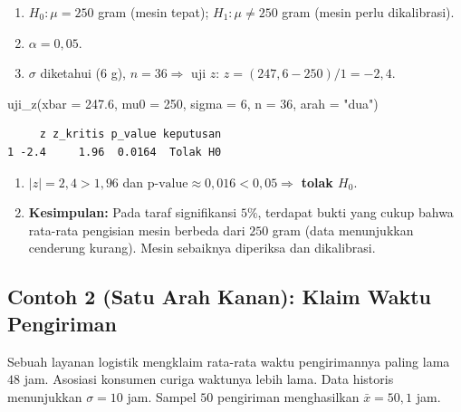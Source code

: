 \documentclass[
  indonesian,
  letterpaper,
]{book}
\newenvironment{Shaded}{\begin{snugshade}}{\end{snugshade}}
\newcommand{\AttributeTok}[1]{\textcolor[rgb]{0.40,0.45,0.13}{#1}}
\newcommand{\DecValTok}[1]{\textcolor[rgb]{0.68,0.00,0.00}{#1}}
\newcommand{\FloatTok}[1]{\textcolor[rgb]{0.68,0.00,0.00}{#1}}
\newcommand{\FunctionTok}[1]{\textcolor[rgb]{0.28,0.35,0.67}{#1}}
\newcommand{\NormalTok}[1]{\textcolor[rgb]{0.00,0.23,0.31}{#1}}
\newcommand{\StringTok}[1]{\textcolor[rgb]{0.13,0.47,0.30}{#1}}
\providecommand{\tightlist}{%
  \setlength{\itemsep}{0pt}\setlength{\parskip}{0pt}}
\begin{document}
\begin{enumerate}
\def\labelenumi{\arabic{enumi}.}
\tightlist
\item
  \(H_0: \mu = 250\) gram (mesin tepat); \(H_1: \mu \ne 250\) gram
  (mesin perlu dikalibrasi).
\item
  \(\alpha = 0{,}05\).
\item
  \(\sigma\) diketahui (\(6\) g), \(n = 36 \Rightarrow\) uji \(z\):
  \(z = (247{,}6 - 250) / 1 = -2{,}4\).
\end{enumerate}

\begin{Shaded}
\begin{Highlighting}[]
\FunctionTok{uji\_z}\NormalTok{(}\AttributeTok{xbar =} \FloatTok{247.6}\NormalTok{, }\AttributeTok{mu0 =} \DecValTok{250}\NormalTok{, }\AttributeTok{sigma =} \DecValTok{6}\NormalTok{, }\AttributeTok{n =} \DecValTok{36}\NormalTok{, }\AttributeTok{arah =} \StringTok{"dua"}\NormalTok{)}
\end{Highlighting}
\end{Shaded}

\begin{verbatim}
     z z_kritis p_value keputusan
1 -2.4     1.96  0.0164  Tolak H0
\end{verbatim}

\begin{enumerate}
\def\labelenumi{\arabic{enumi}.}
\setcounter{enumi}{3}
\tightlist
\item
  \(|z| = 2{,}4 > 1{,}96\) dan
  \(\text{p-value} \approx 0{,}016 < 0{,}05 \Rightarrow\) \textbf{tolak
  \(H_0\)}.
\item
  \textbf{Kesimpulan:} Pada taraf signifikansi \(5\%\), terdapat bukti
  yang cukup bahwa rata-rata pengisian mesin berbeda dari \(250\) gram
  (data menunjukkan cenderung kurang). Mesin sebaiknya diperiksa dan
  dikalibrasi.
\end{enumerate}

\subsection{Contoh 2 (Satu Arah Kanan): Klaim Waktu
Pengiriman}\label{contoh-2-satu-arah-kanan-klaim-waktu-pengiriman}

Sebuah layanan logistik mengklaim rata-rata waktu pengirimannya paling
lama \(48\) jam. Asosiasi konsumen curiga waktunya lebih lama. Data
historis menunjukkan \(\sigma = 10\) jam. Sampel \(50\) pengiriman
menghasilkan \(\bar{x} = 50{,}1\) jam.
\end{document}
